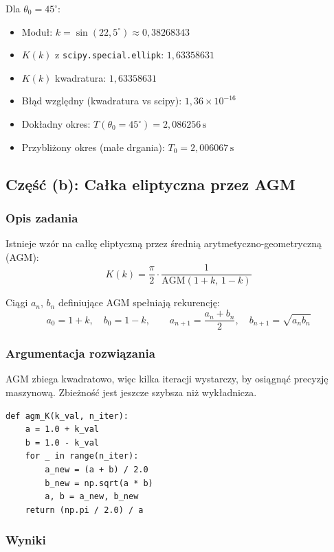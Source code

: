 \documentclass[12pt, a4paper]{article}
\begin{document}
Dla $\theta_0 = 45^{\circ}$:
\begin{itemize}
  \item Moduł: $k = \sin(22{,}5^{\circ}) \approx 0{,}38268343$
  \item $K(k)$ z \texttt{scipy.special.ellipk}: $1{,}63358631$
  \item $K(k)$ kwadratura: $1{,}63358631$
  \item Błąd względny (kwadratura vs scipy): $1{,}36 \times 10^{-16}$
  \item Dokładny okres: $T(\theta_0 = 45^{\circ}) = 2{,}086256\,\text{s}$
  \item Przybliżony okres (małe drgania): $T_0 = 2{,}006067\,\text{s}$
\end{itemize}

\subsection{Część (b): Całka eliptyczna przez AGM}

\subsubsection{Opis zadania}

Istnieje wzór na całkę eliptyczną przez średnią arytmetyczno-geometryczną (AGM):
\[
  K(k) = \frac{\pi}{2} \cdot \frac{1}{\mathrm{AGM}(1+k,\, 1-k)}
\]

Ciągi $a_n$, $b_n$ definiujące AGM spełniają rekurencję:
\[
  a_0 = 1+k, \quad b_0 = 1-k, \qquad a_{n+1} = \frac{a_n+b_n}{2}, \quad b_{n+1} = \sqrt{a_n b_n}
\]

\subsubsection{Argumentacja rozwiązania}

AGM zbiega kwadratowo, więc kilka iteracji wystarczy, by osiągnąć precyzję maszynową. Zbieżność jest jeszcze szybsza niż wykładnicza.

\begin{lstlisting}[caption={Obliczenie K(k) przez AGM}]
def agm_K(k_val, n_iter):
    a = 1.0 + k_val
    b = 1.0 - k_val
    for _ in range(n_iter):
        a_new = (a + b) / 2.0
        b_new = np.sqrt(a * b)
        a, b = a_new, b_new
    return (np.pi / 2.0) / a
\end{lstlisting}

\subsubsection{Wyniki}
\end{document}
